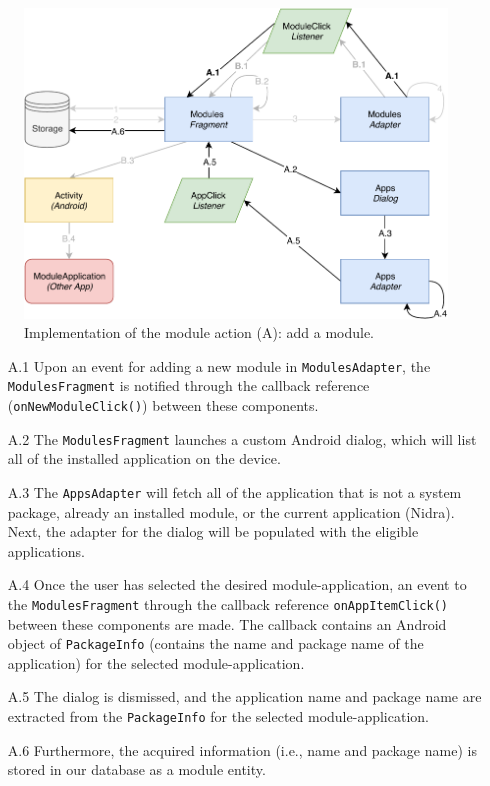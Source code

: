 \begin{figure}
    \centering
    \includegraphics[scale=0.7]{images/Module_ImpA.pdf}
    \caption{Implementation of the module action (A): add a module.}
    \label{fig:impl_modulesA}
\end{figure}

\begin{itemize}
    \item[A.1] Upon an event for adding a new module in \verb|ModulesAdapter|, the \verb|ModulesFragment| is notified through the callback reference (\verb|onNewModuleClick()|) between these components.
    \item[A.2] The \verb|ModulesFragment| launches a custom Android dialog, which will list all of the installed application on the device. 
    \item[A.3] The \verb|AppsAdapter| will fetch all of the application that is not a system package, already an installed module, or the current application (Nidra). Next, the adapter for the dialog will be populated with the eligible applications. 
    \item[A.4] Once the user has selected the desired module-application, an event to the \verb|ModulesFragment| through the callback reference \verb|onAppItemClick()| between these components are made. The callback contains an Android object of \verb|PackageInfo| (contains the name and package name of the application) for the selected module-application.
    \item[A.5] The dialog is dismissed, and the application name and package name are extracted from the \verb|PackageInfo| for the selected module-application. 
    \item[A.6] Furthermore, the acquired information (i.e., name and package name) is stored in our database as a module entity. 
\end{itemize}

